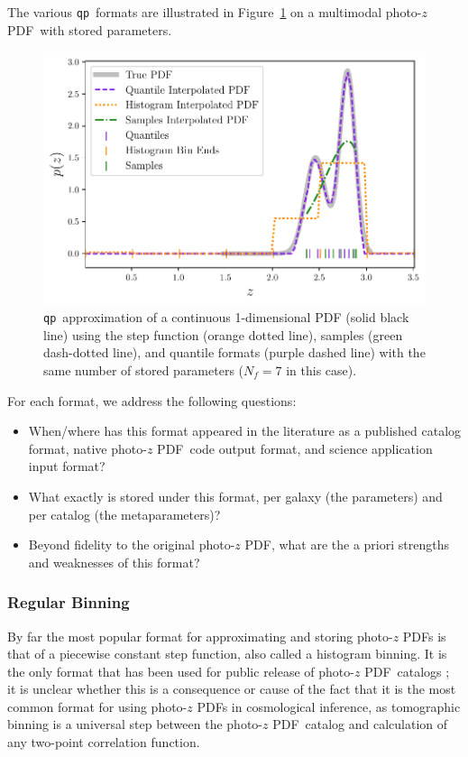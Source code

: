 \documentclass[\docopts]{\docclass}
\newcommand{\qp}{\texttt{qp}}
\newcommand{\pz}{photo-$z$ PDF}
\begin{document}
The various \qp\ formats are illustrated in Figure~\ref{fig:qp} on a multimodal 
\pz\ with stored parameters.
\begin{figure}
  \begin{center}
    \includegraphics[width=\columnwidth]{figures/demo_pz.pdf}
    \caption{\qp\ approximation of a continuous 1-dimensional PDF (solid black 
line) using the step function (orange dotted line), samples (green dash-dotted 
line), and quantile formats (purple dashed line) with the same number of stored 
parameters ($N_{f}=7$ in this case).
    \label{fig:qp}}
  \end{center}
\end{figure}

For each format, we address the following questions:
\begin{itemize}
  \item When/where has this format appeared in the literature as a published 
catalog format, native \pz\ code output format, and science application input 
format?
  \item What exactly is stored under this format, per galaxy (the parameters) 
and per catalog (the metaparameters)?
  \item Beyond fidelity to the original \pz, what are the a priori strengths 
and weaknesses of this format?
\end{itemize}

\subsubsection{Regular Binning}
\label{sec:bins}

By far the most popular format for approximating and storing \pz s is that of a 
piecewise constant step function, also called a histogram binning.  
\citep{carrasco_kind_somz:_2014, sadeh_annz2:_2016, cavuoti_metaphor:_2017}
It is the only format that has been used for public release of \pz\ catalogs 
\citep{tanaka_photometric_2017, sheldon_photometric_2012}; it is unclear 
whether this is a consequence or cause of the fact that it is the most common 
format for using \pz s in cosmological inference, as tomographic binning is a 
universal step between the \pz\ catalog and calculation of any two-point 
correlation function.
\end{document}
